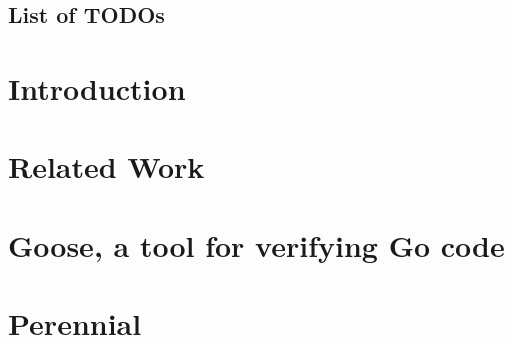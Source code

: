 \documentclass[11pt,twoside,final]{mitthesis}
\makeatletter
\theoremstyle{definition}
\numberwithin{theorem}{chapter}
\newcounter{todo}
\newcommand\listtodoname{List of TODOs}
\newcommand\listoftodos{%
  \section*{\listtodoname}\@starttoc{tod}}
\makeatother
\begin{document}




\begin{abstractpage}

\end{abstractpage}
\cleardoublepage


%

\tableofcontents
\clearpage
\listoffigures
\clearpage
\listoftodos


\chapter{Introduction}%
\label{ch:introduction}


\chapter{Related Work}%
\label{ch:related}


\chapter{Goose, a tool for verifying Go code}%
\label{ch:goose}


\chapter{Perennial}%
\label{ch:perennial}

\end{document}
